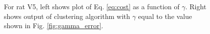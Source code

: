 \documentclass[superscriptaddress, twocolumn, prl]{revtex4}
\begin{document}
\begin{figure}
\centering
{}
\caption{For rat V5, left shows plot of Eq. \ref{eq:cost} as a function of $\gamma$. Right shows output of clustering algorithm with $\gamma$ equal to the value shown in Fig. \ref{fig:gamma_error}.}
\end{figure}
\end{document}
